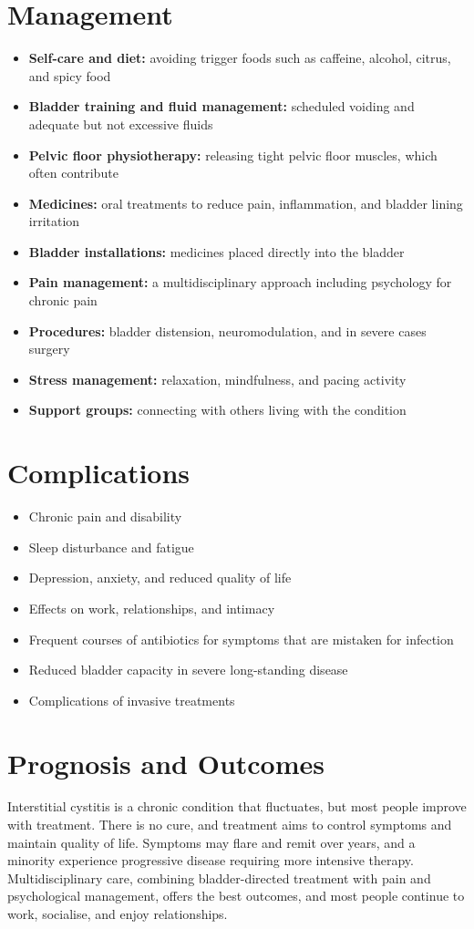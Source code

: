 \section*{Management}
\begin{itemize}
    \item \textbf{Self-care and diet:} avoiding trigger foods such as caffeine, alcohol, citrus, and spicy food
    \item \textbf{Bladder training and fluid management:} scheduled voiding and adequate but not excessive fluids
    \item \textbf{Pelvic floor physiotherapy:} releasing tight pelvic floor muscles, which often contribute
    \item \textbf{Medicines:} oral treatments to reduce pain, inflammation, and bladder lining irritation
    \item \textbf{Bladder installations:} medicines placed directly into the bladder
    \item \textbf{Pain management:} a multidisciplinary approach including psychology for chronic pain
    \item \textbf{Procedures:} bladder distension, neuromodulation, and in severe cases surgery
    \item \textbf{Stress management:} relaxation, mindfulness, and pacing activity
    \item \textbf{Support groups:} connecting with others living with the condition
\end{itemize}

\section*{Complications}
\begin{itemize}
    \item Chronic pain and disability
    \item Sleep disturbance and fatigue
    \item Depression, anxiety, and reduced quality of life
    \item Effects on work, relationships, and intimacy
    \item Frequent courses of antibiotics for symptoms that are mistaken for infection
    \item Reduced bladder capacity in severe long-standing disease
    \item Complications of invasive treatments
\end{itemize}

\section*{Prognosis and Outcomes}
Interstitial cystitis is a chronic condition that fluctuates, but most people improve with treatment. There is no cure, and treatment aims to control symptoms and maintain quality of life. Symptoms may flare and remit over years, and a minority experience progressive disease requiring more intensive therapy. Multidisciplinary care, combining bladder-directed treatment with pain and psychological management, offers the best outcomes, and most people continue to work, socialise, and enjoy relationships.

